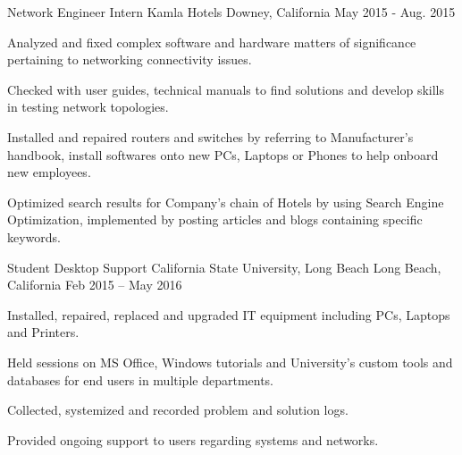 \begin{cventries}
  \cventry
    {Network Engineer Intern} %
    {Kamla Hotels} %
    {Downey, California} %
    {May 2015 - Aug. 2015} %
    {
      \begin{cvitems} %
        \item {Analyzed and fixed complex software and hardware matters of significance pertaining to networking connectivity issues.}
        \item {Checked with user guides, technical manuals to find solutions and develop skills in testing network topologies.}
        \item {Installed and repaired routers and switches by referring to Manufacturer's handbook, install softwares onto new PCs, Laptops or Phones to help onboard new employees.}
        \item {Optimized search results for Company's chain of Hotels by using Search Engine Optimization, implemented by posting articles and blogs containing specific keywords.}
      \end{cvitems}
    }


  \cventry
    {Student Desktop Support} %
    {California State University, Long Beach} %
    {Long Beach, California} %
    {Feb 2015 – May 2016} %
    {
      \begin{cvitems} %
        \item {Installed, repaired, replaced and upgraded IT equipment including PCs, Laptops and Printers.}
        \item {Held sessions on MS Office, Windows tutorials and University's custom tools and databases for end users in multiple departments.}
        \item {Collected, systemized and recorded problem and solution logs.}
        \item {Provided ongoing support to users regarding systems and networks.}
      \end{cvitems}
    }

\end{cventries}
